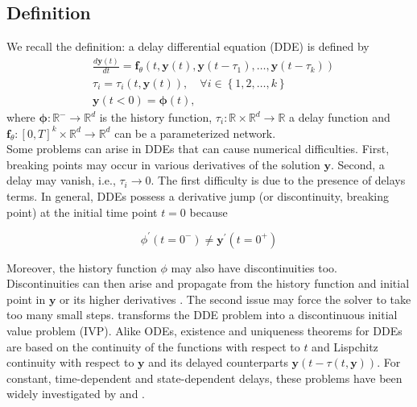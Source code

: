 \documentclass[pmlr]{jmlr}%
\begin{document}
\subsection{Definition}

We recall the definition: a delay differential equation (DDE) is defined by
\begin{equation}
\begin{aligned}
 & \frac{d \mathbf{y}(t)}{dt} = \mathbf{f}_{\theta}(t, \mathbf{y}(t), \mathbf{y}(t-\tau_1), \dots, \mathbf{y}(t-\tau_k)) \\
& \tau_i = \tau_i(t, \mathbf{y}(t)), \quad \forall i \in \left\{1, 2, \ldots,  k\right\} \\
&  \mathbf{y}(t<0) = \boldsymbol{\phi}(t),
\end{aligned}
\label{eqn:dde_def}
\end{equation}
%
where $\mathbf{\boldsymbol{\phi}}: \mathbb{R}^- \rightarrow \mathbb{R}^d$ is the history function, $\tau_i: \mathbb{R} \times \mathbb{R}^d \rightarrow \mathbb{R}$ a delay function and $\mathbf{f}_{\theta}:[0, T]^{k} \times \mathbb{R}^d \rightarrow \mathbb{R}^d$ can be a parameterized network. 
\\

Some problems can arise in DDEs that can cause numerical difficulties. First, breaking points may occur in various derivatives of the solution $\mathbf{y}$. Second, a delay may vanish, i.e., $\tau_i \rightarrow 0$. The first difficulty is due to the presence of delays terms. In general, DDEs possess a derivative jump (or discontinuity, breaking point) at the initial time point $t=0$ because 

\begin{equation*}
    \phi^{\prime}(t=0^{-}) \neq  \mathbf{y}^{\prime}(t=0^{+}) 
\end{equation*}

Moreover, the history function $\phi$ may also have discontinuities too. Discontinuities can then arise and propagate from the history function and initial point in $\mathbf{y}$ or its higher derivatives \citep{numerical_dde}. The second issue may force the solver to take too many small steps. \cite{numerical_dde} transforms the DDE problem into a discontinuous initial value problem (IVP). Alike ODEs, existence and uniqueness theorems for DDEs are based on the continuity of the functions with respect to $t$ and Lispchitz continuity with respect to $\mathbf{y}$ and its delayed counterparts $\mathbf{y}(t-\tau(t,\mathbf{y}))$. For constant, time-dependent and state-dependent delays, these problems have been widely investigated by \citet{Cook_book_ref_dde, existence_general_delay, Driver1962} and \citet{hale2006functional}.
\end{document}
